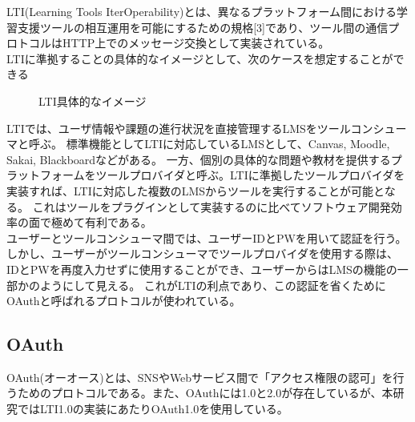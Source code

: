 \label{tag:LTI}
LTI(Learning Tools IterOperability)とは、異なるプラットフォーム間における学習支援ツールの相互運用を可能にするための規格[3]であり、ツール間の通信プロトコルはHTTP上でのメッセージ交換として実装されている。\\
LTIに準拠することの具体的なイメージとして、次のケースを想定することができる

\begin{figure}[htbp]
  \begin{center}
    \caption{LTI具体的なイメージ}
    \label{fig:LTI gaiyou}
  \end{center}
\end{figure}

LTIでは、ユーザ情報や課題の進行状況を直接管理するLMSをツールコンシューマと呼ぶ。
標準機能としてLTIに対応しているLMSとして、Canvas, Moodle, Sakai, Blackboardなどがある。
一方、個別の具体的な問題や教材を提供するプラットフォームをツールプロバイダと呼ぶ。LTIに準拠したツールプロバイダを実装すれば、LTIに対応した複数のLMSからツールを実行することが可能となる。
これはツールをプラグインとして実装するのに比べてソフトウェア開発効率の面で極めて有利である。\\

ユーザーとツールコンシューマ間では、ユーザーIDとPWを用いて認証を行う。しかし、ユーザーがツールコンシューマでツールプロバイダを使用する際は、IDとPWを再度入力せずに使用することができ、ユーザーからはLMSの機能の一部かのようにして見える。
これがLTIの利点であり、この認証を省くためにOAuthと呼ばれるプロトコルが使われている。
\subsection{OAuth}
OAuth(オーオース)とは、SNSやWebサービス間で「アクセス権限の認可」を行うためのプロトコルである。また、OAuthには1.0と2.0が存在しているが、本研究ではLTI1.0の実装にあたりOAuth1.0を使用している。

